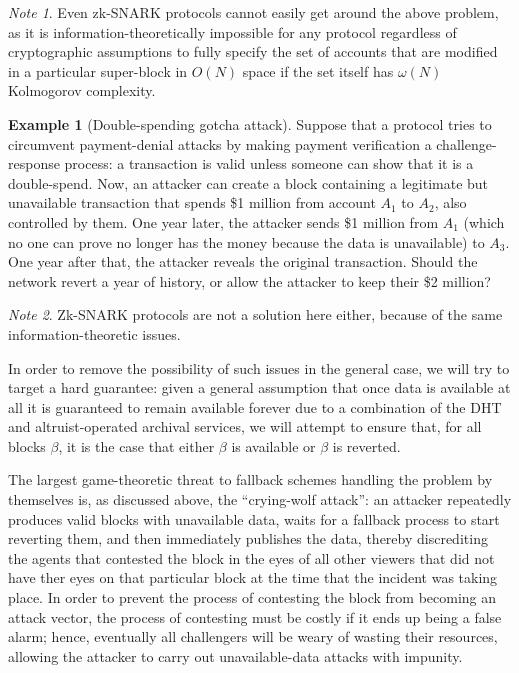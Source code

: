 \documentclass[11pt,a4paper]{report}
\theoremstyle{plain}
\theoremstyle{definition}
\newtheorem{exmp}{Example}[section]
\theoremstyle{remark}
\newtheorem*{note}{Note}
\begin{document}
\begin{note}
Even zk-SNARK protocols cannot easily get around the above problem, as it is information-theoretically impossible for any protocol regardless of cryptographic assumptions to fully specify the set of accounts that are modified in a particular super-block in $O(N)$ space if the set itself has $\omega(N)$ Kolmogorov complexity.
\end{note}

\begin{exmp}[Double-spending gotcha attack]
Suppose that a protocol tries to circumvent payment-denial attacks by making payment verification a challenge-response process: a transaction is valid unless someone can show that it is a double-spend. Now, an attacker can create a block containing a legitimate but unavailable transaction that spends \$1 million from account $A_1$ to $A_2$, also controlled by them. One year later, the attacker sends \$1 million from $A_1$ (which no one can prove no longer has the money because the data is unavailable) to $A_3$. One year after that, the attacker reveals the original transaction. Should the network revert a year of history, or allow the attacker to keep their \$2 million?
\end{exmp}

\begin{note}
Zk-SNARK protocols are not a solution here either, because of the same information-theoretic issues.
\end{note}

In order to remove the possibility of such issues in the general case, we will try to target a hard guarantee: given a general assumption that once data is available at all it is guaranteed to remain available forever due to a combination of the DHT and altruist-operated archival services, we will attempt to ensure that, for all blocks $\beta$, it is the case that either $\beta$ is available or $\beta$ is reverted.

The largest game-theoretic threat to fallback schemes handling the problem by themselves is, as discussed above, the ``crying-wolf attack'': an attacker repeatedly produces valid blocks with unavailable data, waits for a fallback process to start reverting them, and then immediately publishes the data, thereby discrediting the agents that contested the block in the eyes of all other viewers that did not have ther eyes on that particular block at the time that the incident was taking place. In order to prevent the process of contesting the block from becoming an attack vector, the process of contesting must be costly if it ends up being a false alarm; hence, eventually all challengers will be weary of wasting their resources, allowing the attacker to carry out unavailable-data attacks with impunity.
\end{document}
